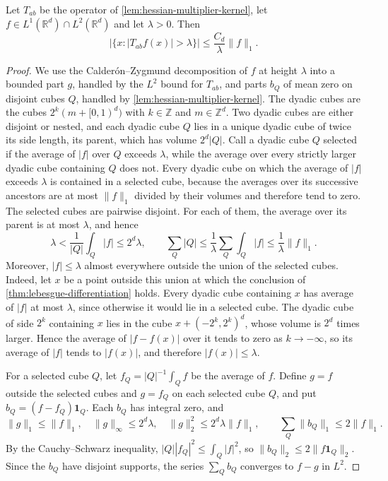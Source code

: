 \begin{lemma}\label{lem:hessian-multiplier-weak-one}
Let $T_{ab}$ be the operator of \cref{lem:hessian-multiplier-kernel}, let $f\in L^1(\mathbb R^d)\cap L^2(\mathbb R^d)$ and let $\lambda>0$. Then
\[
 |\{x:|T_{ab}f(x)|>\lambda\}|\leq\frac{C_d}{\lambda}\|f\|_1.
\]
\end{lemma}
\begin{proof}
We use the Calder\'on--Zygmund decomposition of $f$ at height $\lambda$ into a bounded part $g$, handled by the $L^2$ bound for $T_{ab}$, and parts $b_Q$ of mean zero on disjoint cubes $Q$, handled by \cref{lem:hessian-multiplier-kernel}. The dyadic cubes are the cubes $2^k(m+[0,1)^d)$ with $k\in\mathbb Z$ and $m\in\mathbb Z^d$. Two dyadic cubes are either disjoint or nested, and each dyadic cube $Q$ lies in a unique dyadic cube of twice its side length, its parent, which has volume $2^d|Q|$. Call a dyadic cube $Q$ selected if the average of $|f|$ over $Q$ exceeds $\lambda$, while the average over every strictly larger dyadic cube containing $Q$ does not. Every dyadic cube on which the average of $|f|$ exceeds $\lambda$ is contained in a selected cube, because the averages over its successive ancestors are at most $\|f\|_1$ divided by their volumes and therefore tend to zero. The selected cubes are pairwise disjoint. For each of them, the average over its parent is at most $\lambda$, and hence
\[
 \lambda<\frac1{|Q|}\int_Q|f|\leq2^d\lambda,\qquad
 \sum_Q|Q|\leq\frac1\lambda\sum_Q\int_Q|f|\leq\frac1\lambda\|f\|_1.
\]
Moreover, $|f|\leq\lambda$ almost everywhere outside the union of the selected cubes. Indeed, let $x$ be a point outside this union at which the conclusion of \cref{thm:lebesgue-differentiation} holds. Every dyadic cube containing $x$ has average of $|f|$ at most $\lambda$, since otherwise it would lie in a selected cube. The dyadic cube of side $2^k$ containing $x$ lies in the cube $x+(-2^k,2^k)^d$, whose volume is $2^d$ times larger. Hence the average of $|f-f(x)|$ over it tends to zero as $k\to-\infty$, so its average of $|f|$ tends to $|f(x)|$, and therefore $|f(x)|\leq\lambda$.

For a selected cube $Q$, let $f_Q=|Q|^{-1}\int_Qf$ be the average of $f$. Define $g=f$ outside the selected cubes and $g=f_Q$ on each selected cube $Q$, and put $b_Q=(f-f_Q)\mathbf1_Q$. Each $b_Q$ has integral zero, and
\[
 \|g\|_1\leq\|f\|_1,\quad \|g\|_\infty\leq2^d\lambda,
 \quad \|g\|_2^2\leq2^d\lambda\|f\|_1,
 \qquad \sum_Q\|b_Q\|_1\leq2\|f\|_1.
\]
By the Cauchy--Schwarz inequality, $|Q||f_Q|^2\leq\int_Q|f|^2$, so $\|b_Q\|_2\leq2\|f\mathbf1_Q\|_2$. Since the $b_Q$ have disjoint supports, the series $\sum_Qb_Q$ converges to $f-g$ in $L^2$.


\end{proof}
